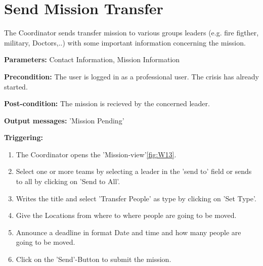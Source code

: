 \section{Send Mission Transfer}
\label{operation:Transfer}
The Coordinator sends transfer mission to various groups leaders (e.g. fire
figther, military, Doctors,..) with some important information concerning the
mission.\\
\begin{description}
\item \textbf{Parameters:} Contact Information, Mission Information
\item \textbf{Precondition:} The user is logged in as a professional user. The
crisis has already started. 
\item \textbf{Post-condition:} The mission is recieved by the concerned leader.
\item \textbf{Output messages:} 'Mission Pending'
\item \textbf{Triggering:}
\begin{enumerate}
\item The Coordinator opens the 'Mission-view'\ref{fig:W13}.
\item Select one or more teams by selecting a leader in the 'send to' field or
sends to all by clicking on 'Send to All'.
\item Writes the title and select 'Transfer People' as type by clicking on 'Set
Type'.
\item Give the Locations from where to where people are going to be moved.
\item Announce a deadline in format Date and time and how many people are going
to be moved.
\item Click on the 'Send'-Button to submit the mission.
\end{enumerate}
\end{description}

